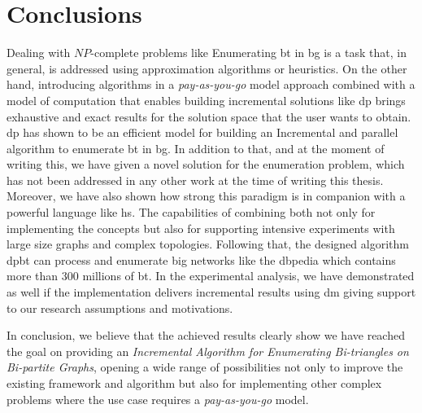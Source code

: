 \section{Conclusions}
Dealing with $NP$-complete problems like Enumerating \acrlong{bt} in \acrlong{bg} is a task that, in general, is addressed using approximation algorithms or heuristics. 
On the other hand, introducing algorithms in a \emph{pay-as-you-go} model approach combined with a model of computation that enables building incremental solutions like \acrshort{dp} brings exhaustive and exact results for the solution space that the user wants to obtain.    
\acrfull{dp} has shown to be an efficient model for building an Incremental and parallel algorithm to enumerate \acrlong{bt} in \acrlong{bg}. 
In addition to that, and at the moment of writing this, we have given a novel solution for the enumeration problem, which has not been addressed in any other work at the time of writing this thesis.
Moreover, we have also shown how strong this paradigm is in companion with a powerful language like \acrfull{hs}. 
The capabilities of combining both not only for implementing the concepts but also for supporting intensive experiments with large size graphs and complex topologies. 
Following that, the designed algorithm \acrshort{dpbt} can process and enumerate big networks like the \acrlong{dbpedia} which contains more than $300$ millions of \acrlong{bt}.
In the experimental analysis, we have demonstrated as well if the implementation delivers incremental results using \acrlong{dm} giving support to our research assumptions and motivations. 

In conclusion, we believe that the achieved results clearly show we have reached the goal on providing an \emph{Incremental Algorithm for Enumerating Bi-triangles on Bi-partite Graphs}, opening a wide range of possibilities not only to improve the existing framework and algorithm but also for implementing other complex problems where the use case requires a \emph{pay-as-you-go} model.
